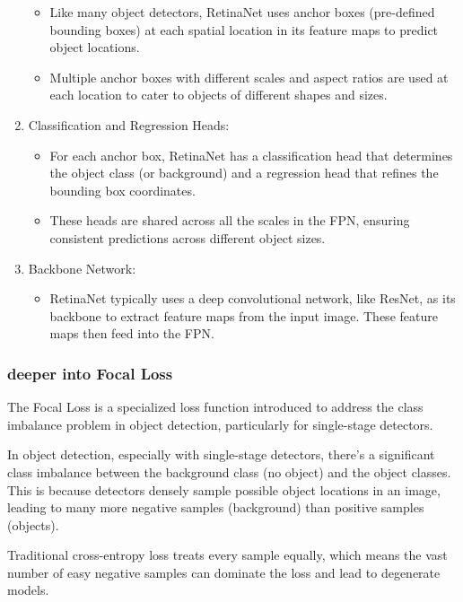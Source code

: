 \documentclass{article}
\begin{document}
\begin{enumerate}
\begin{itemize}
    \item Like many object detectors, RetinaNet uses anchor boxes (pre-defined bounding boxes) at each spatial location in its feature maps to predict object locations.
    \item Multiple anchor boxes with different scales and aspect ratios are used at each location to cater to objects of different shapes and sizes.
\end{itemize}
  \item Classification and Regression Heads:
  \begin{itemize}
    \item For each anchor box, RetinaNet has a classification head that determines the object class (or background) and a regression head that refines the bounding box coordinates.
    \item These heads are shared across all the scales in the FPN, ensuring consistent predictions across different object sizes.
\end{itemize}
  \item Backbone Network:

  \begin{itemize}
    \item RetinaNet typically uses a deep convolutional network, like ResNet, as its backbone to extract feature maps from the input image. These feature maps then feed into the FPN.
  \end{itemize}
\end{enumerate}

\subsubsection{deeper into Focal Loss}

The Focal Loss is a specialized loss function introduced to address the class imbalance problem in object detection, particularly for single-stage detectors.

In object detection, especially with single-stage detectors, there's a significant class imbalance between the background class (no object) and the object classes. This is because detectors densely sample possible object locations in an image, leading to many more negative samples (background) than positive samples (objects).

Traditional cross-entropy loss treats every sample equally, which means the vast number of easy negative samples can dominate the loss and lead to degenerate models.
\end{document}
